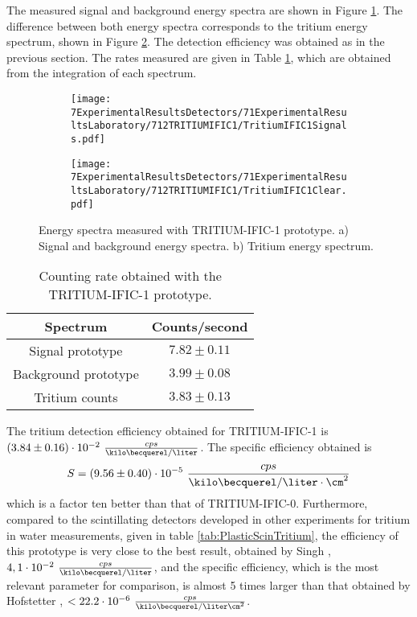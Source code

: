 The measured signal and background energy spectra are shown in Figure \ref{subfig:SignalBackgroundEnergySpectraTritiumIFIC1}. The difference between both energy spectra corresponds to the tritium energy spectrum, shown in Figure \ref{subfig:TritiumEnergySpectraTritiumIFIC1}. The detection efficiency was obtained as in the previous section. The rates measured are given in Table \ref{tab:CountsPerSecondTRITIUMIFIC1}, which are obtained from the integration of each spectrum.

\begin{figure}
\centering
    \begin{subfigure}[b]{1\textwidth}
    \centering
    \texttt{[image: 7ExperimentalResultsDetectors/71ExperimentalResultsLaboratory/712TRITIUMIFIC1/TritiumIFIC1Signals.pdf]}  
    \caption{\label{subfig:SignalBackgroundEnergySpectraTritiumIFIC1}}
    \end{subfigure}
    \hfill
    \begin{subfigure}[b]{1\textwidth}
    \centering
    \texttt{[image: 7ExperimentalResultsDetectors/71ExperimentalResultsLaboratory/712TRITIUMIFIC1/TritiumIFIC1Clear.pdf]}  
    \caption{\label{subfig:TritiumEnergySpectraTritiumIFIC1}}
    \end{subfigure}
 \caption{Energy spectra measured with TRITIUM-IFIC-1 prototype. a) Signal and background energy spectra. b) Tritium energy spectrum.}
 \label{fig:EnergySpectraTRITIUMIFIC1}
\end{figure}

\begin{table}[htbp]
\centering{}%
\begin{tabular}{cc}
\toprule 
Spectrum & Counts/second \tabularnewline
\midrule
\midrule 
Signal prototype & $7.82 \pm 0.11$ \tabularnewline
Background prototype & $3.99 \pm 0.08$ \tabularnewline  
Tritium counts & $3.83 \pm 0.13$ \tabularnewline
\bottomrule
\end{tabular}
\caption{Counting rate obtained with the TRITIUM-IFIC-1 prototype.}
\label{tab:CountsPerSecondTRITIUMIFIC1}
\end{table}

The tritium detection efficiency obtained for TRITIUM-IFIC-1 is $(3.84 \pm 0.16)\cdot{} 10^{-2}~\frac{cps}{\kilo\becquerel/\liter}$. The specific efficiency obtained is
$$S=(9.56 \pm 0.40)\cdot{} 10^{-5}~\frac{cps}{\kilo\becquerel/\liter \cdot{} \cm^{2}}$$
which is a factor ten better than that of TRITIUM-IFIC-0. Furthermore, compared to the scintillating detectors developed in other experiments for tritium in water measurements, given in table \ref{tab:PlasticScinTritium}, the efficiency of this prototype is very close to the best result, obtained by Singh \cite{Ratnakaran, Ratnakaran2000}, $4,1 \cdot{} 10^{-2}~\frac{cps}{\kilo\becquerel/\liter}$, and the specific efficiency, which is the most relevant parameter for comparison, is almost 5 times larger than that obtained by Hofstetter \cite{Hofstetter1, Hofstetter2}, $<22.2 \cdot{} 10^{-6}~\frac{cps}{\kilo\becquerel/\liter\cm^{2}}$.
